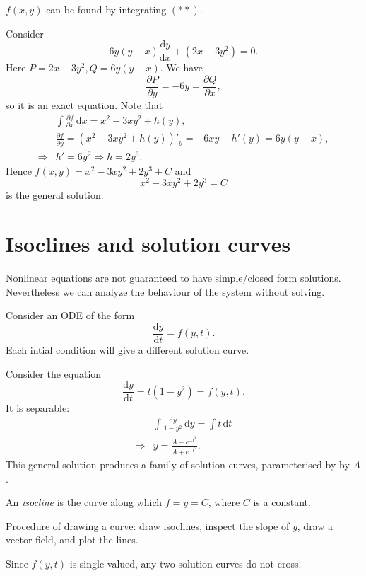 \documentclass[10pt]{article}
\def\d{{\mathrm d}}
\begin{document}
    $f(x,y)$ can be found by integrating $(**)$.
    \begin{example}
        Consider 
        \[
            6y(y-x)\frac{\mathrm{d}y}{\mathrm{d}x}+(2x-3y^2)=0 
        .\]
        Here $P=2x-3y^2, Q=6y(y-x)$. We have 
        \[
            \frac{\partial P}{\partial y}=-6y= \frac{\partial Q}{\partial x}
        ,\]
        so it is an exact equation.
        Note that 
        \[
            \begin{aligned}
                 &\int \frac{\partial f}{\partial x}  \,\mathrm{d}x=x^2-3xy^2+h(y),\\
                 &\frac{\partial f}{\partial y}=(x^2-3xy^2+h(y))'_y= -6xy+h'(y)=6y(y-x),\\
                 \Longrightarrow & h'=6y^2 \Longrightarrow h=2y^3.
            \end{aligned}
        \]
        Hence $f(x,y)=x^2-3xy^2+2y^3+C$ and 
        \[
            x^2-3xy^2+2y^3=C
        \]
        is the general solution. 
    \end{example}
    \section{Isoclines and solution curves}
    Nonlinear equations are not guaranteed to have simple/closed form solutions. Nevertheless we can analyze the behaviour of the system without solving.

    Consider an ODE of the form 
    \[
        \frac{\mathrm{d}y}{\mathrm{d}t}=f(y,t) 
    .\]
    Each intial condition will give a different solution curve.
    \begin{example}
        Consider the equation 
        \[
            \frac{\mathrm{d}y}{\mathrm{d}t}=t(1-y^2)=f(y,t) \tag{$*$}
        .\]
        It is separable:
        \[
            \begin{aligned}
                 &\int \frac{\d y}{1-y^2} \,\mathrm{d}y=\int t \,\mathrm{d}t\\
                 \Longrightarrow &y= \frac{A-e^{-t^2}}{A+e^{-t^2}}.
            \end{aligned}
        \]
        This general solution produces a family of solution curves, parameterised by by $A$.
    \end{example}
    \begin{definition}[Isocline]
        An \textit{isocline} is the curve along which $ f=\dot{y}=C $, where $C$ is a constant.
    \end{definition}
    Procedure of drawing a curve: draw isoclines, inspect the slope of $y$, draw a vector field, and plot the lines.
    \begin{remark}
        Since $f(y,t)$ is single-valued, any two solution curves do not cross.
    \end{remark}
\end{document}
